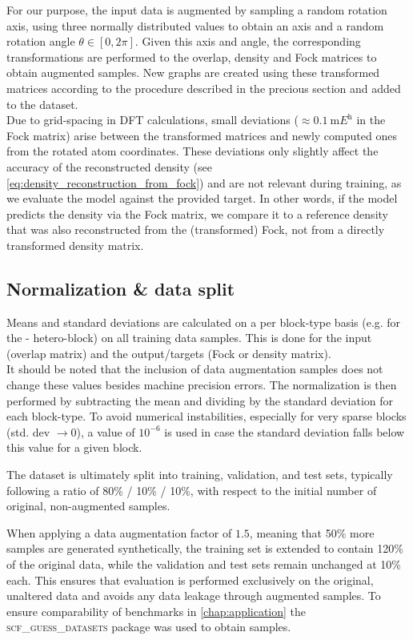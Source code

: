 For our purpose, the input data is augmented by sampling a random rotation axis, using three normally distributed values to obtain an axis and a random rotation angle $\theta \in [0, 2\pi]$. Given this axis and angle, the corresponding transformations are performed to the overlap, density and Fock matrices to obtain augmented samples. New graphs are created using these transformed matrices according to the procedure described in the precious section and added to the dataset. \\
Due to grid-spacing in DFT calculations, small deviations ($\approx \SI{0.1}{\milli\hartree}$ in the Fock matrix) arise between the transformed matrices and newly computed ones from the rotated atom coordinates. These deviations only slightly affect the accuracy of the reconstructed density (see \autoref{eq:density_reconstruction_from_fock}) and are not relevant during training, as we evaluate the model against the provided target. In other words, if the model predicts the density via the Fock matrix, we compare it to a reference density that was also reconstructed from the (transformed) Fock, not from a directly transformed density matrix. %

\subsection{Normalization \& data split}
\label{subsec:gnn_normalization}
Means and standard deviations are calculated on a per block-type basis (e.g. for the - hetero-block) on all training data samples. This is done for the input (overlap matrix) and the output/targets (Fock or density matrix).\\
It should be noted that the inclusion of data augmentation samples does not change these values besides machine precision errors. The normalization is then performed by subtracting the mean and dividing by the standard deviation for each block-type. To avoid numerical instabilities, especially for very sparse blocks (std. dev $\rightarrow 0$), a value of $10^{-6}$ is used in case the standard deviation falls below this value for a given block.

The dataset is ultimately split into training, validation, and test sets, typically following a ratio of 80\% / 10\% / 10\%, with respect to the initial number of original, non-augmented samples.

When applying a data augmentation factor of $1.5$, meaning that 50\% more samples are generated synthetically, the training set is extended to contain 120\% of the original data, while the validation and test sets remain unchanged at 10\% each. This ensures that evaluation is performed exclusively on the original, unaltered data and avoids any data leakage through augmented samples. To ensure comparability of benchmarks in \autoref{chap:application} the \textsc{scf\_guess\_datasets} package was used to obtain samples. \parencite{ref:milacher_scf_guess_datasets}

